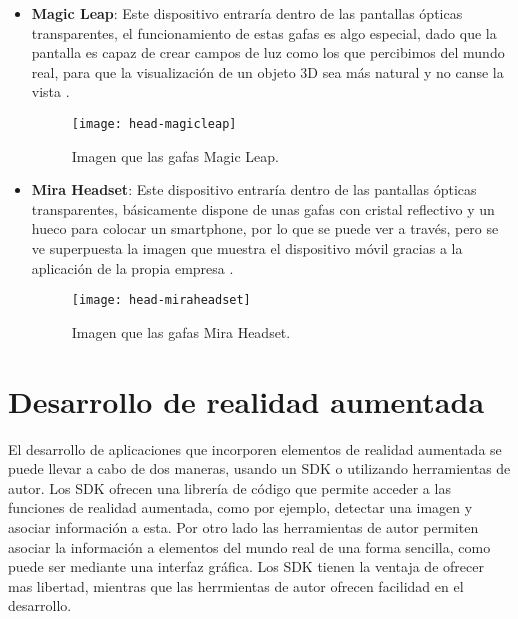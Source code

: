 \begin{itemize}

  \newpage

  \item \textbf{Magic Leap}: Este dispositivo entraría dentro de las pantallas ópticas transparentes, el funcionamiento de estas gafas es algo especial, dado que la pantalla es capaz de crear campos de luz como los que percibimos del mundo real, para que la visualización de un objeto 3D sea más natural y no canse la vista \cite{magic-leap}.

  \begin{figure}[h]
    \centering
    \texttt{[image: head-magicleap]}
    \caption{Imagen que las gafas Magic Leap.\protect\footnotemark}
    \label{figura-magicleap}
  \end{figure}


  \item \textbf{Mira Headset}: Este dispositivo entraría dentro de las pantallas ópticas transparentes, básicamente dispone de unas gafas con cristal reflectivo y un hueco para colocar un smartphone, por lo que se puede ver a través, pero se ve superpuesta la imagen que muestra el dispositivo móvil gracias a la aplicación de la propia empresa \cite{mira-ar}.

  \begin{figure}[h]
    \centering
    \texttt{[image: head-miraheadset]}
    \caption{Imagen que las gafas Mira Headset.\protect\footnotemark}
    \label{figura-miraheadset}
  \end{figure}


\end{itemize}

\section{Desarrollo de realidad aumentada}
El desarrollo de aplicaciones que incorporen elementos de realidad aumentada se puede llevar a cabo de dos maneras, usando un SDK o utilizando herramientas de autor. Los SDK ofrecen una librería de código que permite acceder a las funciones de realidad aumentada, como por ejemplo, detectar una imagen y asociar información a esta. Por otro lado las herramientas de autor permiten asociar la información a elementos del mundo real de una forma sencilla, como puede ser mediante una interfaz gráfica. Los SDK tienen la ventaja de ofrecer mas libertad, mientras que las herrmientas de autor ofrecen facilidad en el desarrollo.

